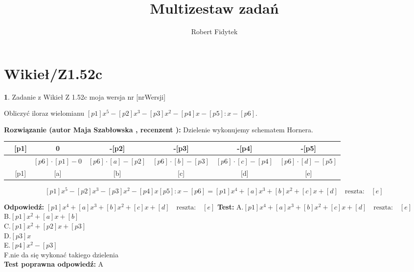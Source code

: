 \documentclass[12pt, a4paper]{article}
\title{Multizestaw zadań}
\author{Robert Fidytek}
\date{}
\theoremstyle{definition} %
\newtheorem{zad}{}
\newcommand{\kategoria}[1]{\section{#1}} %
\newcommand{\zadStart}[1]{\begin{zad}#1\newline} %
\newcommand{\zadStop}{\end{zad}}   %
\newcommand{\rozwStart}[2]{\noindent \textbf{Rozwiązanie (autor #1 , recenzent #2): }\newline} %
\newcommand{\rozwStop}{\newline}                                            %
\newcommand{\odpStart}{\noindent \textbf{Odpowiedź:}\newline}    %
\newcommand{\odpStop}{\newline}                                             %
\newcommand{\testStart}{\noindent \textbf{Test:}\newline} %
\newcommand{\testStop}{\newline} %
\newcommand{\kluczStart}{\noindent \textbf{Test poprawna odpowiedź:}\newline} %
\newcommand{\kluczStop}{\newline} %
\begin{document}
\maketitle


\kategoria{Wikieł/Z1.52c}
\zadStart{Zadanie z Wikieł Z 1.52c moja wersja nr [nrWersji]}

Obliczyć iloraz wielomianu $[p1]x^{5}-[p2]x^{3}-[p3]x^{2}-[p4]x-[p5] : x - [p6].$
\zadStop

\rozwStart{Maja Szabłowska}{}
Dzielenie wykonujemy schematem Hornera.
\begin{table}[h!]
\begin{tabular}{|c|c|c|c|c|c|c|}
\hline
 &
  [p1] &
  0 &
  -[p2] &
  -[p3] &
  -[p4] &
  -[p5] \\ \hline
 &
   &
  $[p6]\cdot[p1]-0$ &
  $[p6]\cdot[a]-[p2]$ &
  $[p6]\cdot[b]-[p3]$ &
  $[p6]\cdot[c]-[p4]$ &
  $[p6]\cdot[d]-[p5]$ \\ \hline
[p6] &
  [p1] &
  [a] &
  [b] &
  [c] &
  [d] &
  [e] \\ \hline
\end{tabular}
\end{table}
$$[p1]x^{5}-[p2]x^{3}-[p3]x^{2}-[p4]x[p5] : x - [p6]= [p1]x^{4}+[a]x^{3}+[b]x^{2}+[c]x+[d] \quad \textrm{reszta:}\quad [e]$$
\rozwStop


\odpStart
$[p1]x^{4}+[a]x^{3}+[b]x^{2}+[c]x+[d] \quad \textrm{reszta:}\quad [e]$
\odpStop
\testStart
A.$[p1]x^{4}+[a]x^{3}+[b]x^{2}+[c]x+[d] \quad \textrm{reszta:}\quad [e]$\\
B.$[p1]x^{2}+[a]x+[b]$\\
C.$[p1]x^{2}+[p2]x+[p3]$\\
D.$[p3]x$\\
E.$[p4]x^{2}-[p3]$\\
F.nie da się wykonać takiego dzielenia\\
\testStop
\kluczStart
A
\kluczStop
\end{document}
